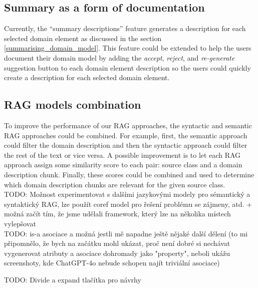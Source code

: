 \subsection{Summary as a form of documentation}

Currently, the ``summary descriptions'' feature generates a description for each selected domain element as discussed in the section \ref{summarising_domain_model}. This feature could be extended to help the users document their domain model by adding the \textit{accept}, \textit{reject}, and \textit{re-generate} suggestion button to each domain element description so the users could quickly create a description for each selected domain element.


\subsection{RAG models combination}

To improve the performance of our RAG approaches, the syntactic and semantic RAG approaches could be combined. For example, first, the semantic approach could filter the domain description and then the syntactic approach could filter the rest of the text or vice versa. A possible improvement is to let each RAG approach assign some similarity score to each pair: source class and a domain description chunk. Finally, these scores could be combined and used to determine which domain description chunks are relevant for the given source class. \\

\noindent{}TODO: Možnost experimentovat s dalšími jazykovými modely pro sémantický a syntaktický RAG, lze použít coref model pro řešení problému se zájmeny, atd. + možná začít tím, že jsme udělali framework, který lze na několika místech vylepšovat \\

\noindent{}TODO: is-a asociace a možná jestli mě napadne ještě nějaké další dělení (to mi připomnělo, že bych na začátku mohl ukázat, proč není dobré si nechávat vygenerovat atributy a asociace dohromady jako "property", neboli ukážu screenshoty, kde ChatGPT-4o nebude schopen najít triviální asociace)

\noindent{}TODO: Divide a expand tlačítka pro návrhy